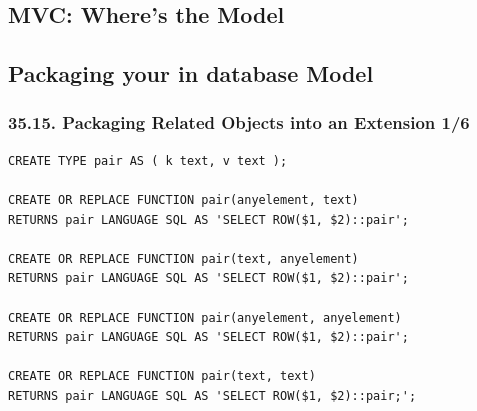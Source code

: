 \documentclass[english]{beamer}
\begin{document}
\subsection{MVC: Where's the Model}



\subsection{Packaging your in database Model}

\begin{frame}[fragile]
  \frametitle{35.15. Packaging Related Objects into an Extension 1/6}

\begin{example}
\begin{verbatim}
CREATE TYPE pair AS ( k text, v text );

CREATE OR REPLACE FUNCTION pair(anyelement, text)
RETURNS pair LANGUAGE SQL AS 'SELECT ROW($1, $2)::pair';

CREATE OR REPLACE FUNCTION pair(text, anyelement)
RETURNS pair LANGUAGE SQL AS 'SELECT ROW($1, $2)::pair';

CREATE OR REPLACE FUNCTION pair(anyelement, anyelement)
RETURNS pair LANGUAGE SQL AS 'SELECT ROW($1, $2)::pair';

CREATE OR REPLACE FUNCTION pair(text, text)
RETURNS pair LANGUAGE SQL AS 'SELECT ROW($1, $2)::pair;';  
\end{verbatim}
\end{example}
\end{frame}
\end{document}
